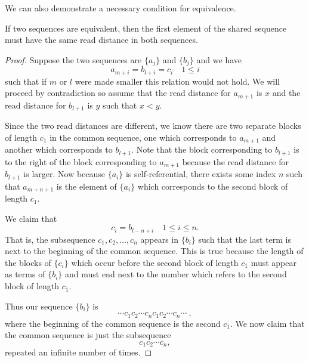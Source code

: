 \documentclass[runningheads,a4paper]{llncs}
\begin{document}
We can also demonstrate a necessary condition for equivalence. 
\begin{theorem}
\label{thm:readfirst}
If two sequences are equivalent, then the first element of the shared sequence must have the same read distance in both sequences.
\end{theorem}

\begin{proof}
Suppose the two sequences are $\{a_j\}$ and $\{b_j\}$ and we have 
\begin{equation*}
a_{m+i} = b_{l+i} = c_{i} \quad 1 \leq i
\end{equation*}
such that if $m$ or $l$ were made smaller this relation would not hold. We will proceed by contradiction so assume that the read distance for $a_{m+1}$ is $x$ and the read distance for $b_{l+1}$ is $y$ such that $x<y$.


Since the two read distances are different, we know there are two separate blocks of length $c_1$ in the common sequence, one which corresponds to $a_{m+1}$ and another which corresponds to $b_{l+1}$. Note that the block corresponding to $b_{l+1}$ is to the right of the block corresponding to $a_{m+1}$ because the read distance for $b_{l+1}$ is larger. Now because $\{a_i\}$ is self-referential, there exists some index $n$ such that $a_{m+n+1}$ is the element of $\{a_i\}$ which corresponds to the second block of length $c_1$. 

We claim that
\begin{equation*}
c_i = b_{l-n+i} \quad 1 \leq i \leq n.
\end{equation*}
That is, the subsequence $c_1, c_2, \ldots, c_{n}$ appears in $\{b_i\}$ such that the last term is next to the beginning of the common sequence. This is true because the length of the blocks of $\{c_i\}$ which occur before the second block of length $c_1$ must appear as terms of $\{b_i\}$ and must end next to the number which refers to the second block of length $c_1$.

Thus our sequence $\{b_i\}$ is  
\begin{equation*}
\cdots c_1 c_2 \cdots c_{n} c_1 c_2 \cdots c_n \cdots \ ,
\end{equation*}
where the beginning of the common sequence is the second $c_1$. We now claim that the common sequence is just the subsequence
\begin{equation*}
c_1 c_2 \cdots c_n,
\end{equation*}
repeated an infinite number of times. 


\end{proof}
\end{document}

